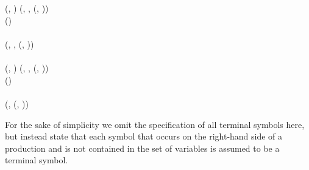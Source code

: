\begin{table}
\begin{bnf*}
{		} \\
		 \\
		 {
			(, \bnfsp {}) \bnfor {}(, \bnfsp {}, \bnfsp {}(, \bnfsp {}))
		} \\
		 {
			() \bnfsp {} \bnfsp {}
		} \\ \\
		 {
			(\bnfts{$\omega$}, \bnfsp {}, \bnfsp {}(, \bnfsp {})) \bnfor
		} \\
		 \\
		 {
			(, \bnfsp {}) \bnfor {}(, \bnfsp {}, \bnfsp {}(, \bnfsp {}))
		} \\ 
		 {
			() \bnfsp {} \bnfsp {}
		} \\ \\
		 {
			(, \bnfsp {}(, \bnfsp {}))
		} \\
		 {
			 \bnfor \bnfes
		}
	\end{bnf*}
\end{table}
For the sake of simplicity we omit the specification of all terminal symbols here, but instead state that each symbol that occurs on the right-hand side of a production and is not contained in the set of variables is assumed to be a terminal symbol.
